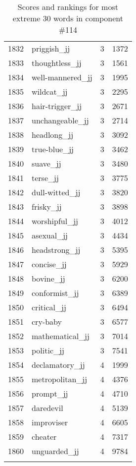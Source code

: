 \begin{longtable}[!htbp]{| rlr@{.}l |}
    1832 & priggish\_jj & 3 & 1372 \\
    1833 & thoughtless\_jj & 3 & 1561 \\
    1834 & well-mannered\_jj & 3 & 1995 \\
    1835 & wildcat\_jj & 3 & 2295 \\
    1836 & hair-trigger\_jj & 3 & 2671 \\
    1837 & unchangeable\_jj & 3 & 2714 \\
    1838 & headlong\_jj & 3 & 3092 \\
    1839 & true-blue\_jj & 3 & 3462 \\
    1840 & suave\_jj & 3 & 3480 \\
    1841 & terse\_jj & 3 & 3775 \\
    1842 & dull-witted\_jj & 3 & 3820 \\
    1843 & frisky\_jj & 3 & 3898 \\
    1844 & worshipful\_jj & 3 & 4012 \\
    1845 & asexual\_jj & 3 & 4434 \\
    1846 & headstrong\_jj & 3 & 5395 \\
    1847 & concise\_jj & 3 & 5929 \\
    1848 & bovine\_jj & 3 & 6200 \\
    1849 & conformist\_jj & 3 & 6389 \\
    1850 & critical\_jj & 3 & 6494 \\
    1851 & cry-baby & 3 & 6577 \\
    1852 & mathematical\_jj & 3 & 7014 \\
    1853 & politic\_jj & 3 & 7541 \\
    1854 & declamatory\_jj & 4 & 1999 \\
    1855 & metropolitan\_jj & 4 & 4376 \\
    1856 & prompt\_jj & 4 & 4710 \\
    1857 & daredevil & 4 & 5139 \\
    1858 & improviser & 4 & 6605 \\
    1859 & cheater & 4 & 7317 \\
    1860 & unguarded\_jj & 4 & 9784 \\
    \hline
    \caption{Scores and rankings for most extreme 30 words in component \#114} \\
\end{longtable}
